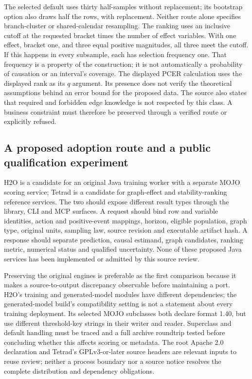 The selected default uses thirty half-samples without replacement; its
bootstrap option also draws half the rows, with replacement. Neither route
alone specifies branch-cluster or shared-calendar resampling. The ranking
uses an inclusive cutoff at the requested bracket times the number of effect
variables. With one effect, bracket one, and three equal positive magnitudes,
all three meet the cutoff. If this happens in every subsample, each has
selection frequency one. That frequency is a property of the construction;
it is not automatically a probability of causation or an interval's coverage.
The displayed PCER calculation uses the displayed rank as its $q$ argument.
Its presence does not verify the theoretical assumptions behind an error bound
for the proposed data. The source also states that required and forbidden
edge knowledge is not respected by this class. A business constraint must
therefore be preserved through a verified route or explicitly refused.
\citep{exec20_javaeffects_tetrad,exec20_javaeffects_reference}

\subsection{A proposed adoption route and a public qualification experiment}
\label{exec20:javafx-adoption}

H2O is a candidate for an original Java training worker with a separate MOJO
scoring service; Tetrad is a candidate for graph-effect and stability-ranking
reference services. The two should expose different result types through the
library, CLI and MCP surfaces. A request should bind row and variable identities,
action and positive-event mappings, horizon, eligible population, graph type,
original units, sampling law, source revision and executable artifact hash.
A response should separate prediction, causal estimand, graph candidates,
ranking metric, numerical status and qualified uncertainty. None of these
proposed Java services has been implemented or admitted by this source review.
\citep{exec20_javaeffects_h2o,exec20_javaeffects_tetrad}

Preserving the original engines is preferable as the first comparison because
it makes a source-to-output discrepancy observable before maintaining a port.
H2O's training and generated-model modules have different dependencies; the
generated-model build's compatibility setting is not a statement about every
training deployment. Its selected MOJO subclasses both declare format 1.40,
but use different threshold-key strings in their writer and reader. Superclass
and default handling must be traced and a full archive roundtrip tested before
concluding whether this affects scoring or metadata. The root Apache 2.0
declaration and Tetrad's GPLv3-or-later source headers are relevant inputs to
reuse review; neither a process boundary nor a source notice resolves the
complete distribution and dependency obligations.
\citep{exec20_javaeffects_h2o,exec20_javaeffects_tetrad}

